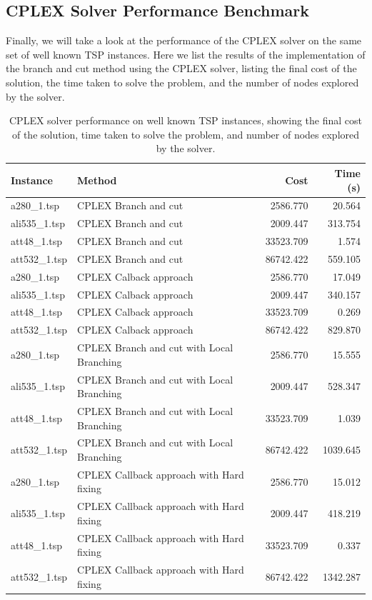 \documentclass{article}
\begin{document}
\subsection{CPLEX Solver Performance Benchmark}
Finally, we will take a look at the performance of the CPLEX solver on the same set of well known TSP instances. Here we list the results of the implementation of the branch and cut method using 
the CPLEX solver, listing the final cost of the solution, the time taken to solve the problem, and the number of nodes explored by the solver.
\begin{table}[!ht]
	\centering
	\begin{tabular}{|l|l|r|r|}
	\hline
	\textbf{Instance} & \textbf{Method} & \textbf{Cost} & \textbf{Time (s)} \\
	\hline
	a280\_1.tsp & CPLEX Branch and cut & 2586.770 & 20.564 \\
	ali535\_1.tsp & CPLEX Branch and cut & 2009.447 & 313.754 \\
	att48\_1.tsp & CPLEX Branch and cut & 33523.709 & 1.574 \\
	att532\_1.tsp & CPLEX Branch and cut & 86742.422 & 559.105 \\
	a280\_1.tsp & CPLEX Calback approach & 2586.770 & 17.049 \\
	ali535\_1.tsp & CPLEX Calback approach & 2009.447 & 340.157 \\
	att48\_1.tsp & CPLEX Calback approach & 33523.709 & 0.269 \\
	att532\_1.tsp & CPLEX Calback approach & 86742.422 & 829.870 \\
	a280\_1.tsp & CPLEX Branch and cut with Local Branching & 2586.770 & 15.555 \\
	ali535\_1.tsp & CPLEX Branch and cut with Local Branching & 2009.447 & 528.347 \\
	att48\_1.tsp & CPLEX Branch and cut with Local Branching & 33523.709 & 1.039 \\
	att532\_1.tsp & CPLEX Branch and cut with Local Branching & 86742.422 & 1039.645 \\
	a280\_1.tsp & CPLEX Callback approach with Hard fixing  & 2586.770 & 15.012 \\
	ali535\_1.tsp & CPLEX Callback approach with Hard fixing  & 2009.447 & 418.219 \\
	att48\_1.tsp & CPLEX Callback approach with Hard fixing  & 33523.709 & 0.337 \\
	att532\_1.tsp & CPLEX Callback approach with Hard fixing  & 86742.422 & 1342.287 \\
	\hline
	\end{tabular}
	\caption{CPLEX solver performance on well known TSP instances, showing the final cost of the solution, time taken to solve the problem, and number of nodes explored by the solver.}
	\label{tab:cplex_performance}
\end{table}
\end{document}
